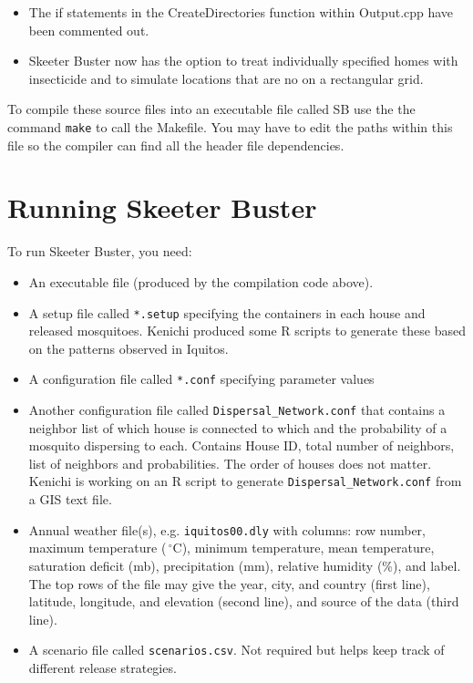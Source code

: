 \documentclass[11pt]{article}
\newcommand{\linecmd}[1]{\texttt{#1}}
\begin{document}
\begin{itemize}
\item The if statements in the CreateDirectories function within Output.cpp have been commented out. 
\item Skeeter Buster now has the option to treat individually specified homes with insecticide and to simulate locations that are no on a rectangular grid.
\end{itemize}

To compile these source files into an executable file called SB use the the command \linecmd{make} to call the Makefile. You may have to edit the paths within this file so the compiler can find all the header file dependencies.

\newpage{}\section{Running Skeeter Buster}

To run Skeeter Buster, you need:
\begin{itemize}
	\item An executable file (produced by the compilation code above).
	\item A setup file called \linecmd{*.setup}  specifying the containers in each house and released mosquitoes. Kenichi produced some R scripts to generate these based on the patterns observed in Iquitos.
	\item A configuration file called \linecmd{*.conf} specifying parameter values
	\item Another configuration file called \linecmd{Dispersal\_Network.conf} that contains a neighbor list of which house is connected to which and the probability of a mosquito dispersing to each. Contains House ID, total number of neighbors, list of neighbors and probabilities. The order of houses does not matter. Kenichi is working on an R script to generate \linecmd{Dispersal\_Network.conf} from a GIS text file.
	\item Annual weather file(s), e.g. \linecmd{iquitos00.dly} with columns: row number, maximum temperature ($\,^{\circ}\mathrm{C}$), minimum temperature, mean temperature, saturation deficit (mb), precipitation (mm), relative humidity (\%), and label. The top rows of the file may give the year, city, and country (first line), latitude, longitude, and elevation (second line), and source of the data (third line).
	\item A scenario file called \linecmd{scenarios.csv}. Not required but helps keep track of different release strategies.
	\end{itemize}
\end{document}
